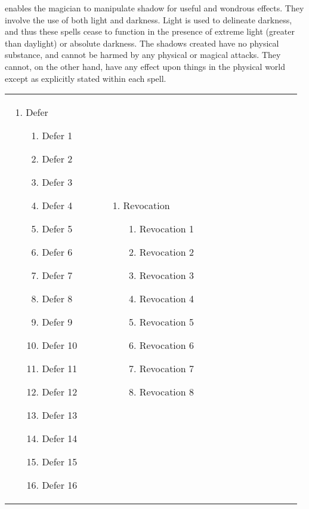  enables the magician to manipulate shadow for useful and wondrous effects. They involve the use of both light and darkness. Light is used to delineate darkness, and thus these spells cease to function in the presence of extreme
light (greater than daylight) or absolute darkness. The shadows created have no physical substance, and cannot be harmed by any physical or magical attacks. They cannot, on the other hand, have any effect upon things in the physical world except as explicitly stated within each spell.

\renewcommand{\labelenumii}{\arabic{enumii}.}
\begin{tabular}{@{} p{0.33\linewidth} p{0.33\linewidth} p{0.33\linewidth}}
\begin{enumerate}
	\item Defer
	\begin{enumerate}
		\item Defer 1
		\item Defer 2
		\item Defer 3
		\item Defer 4
		\item Defer 5
		\item Defer 6
		\item Defer 7
		\item Defer 8
		\item Defer 9
		\item Defer 10
		\item Defer 11
		\item Defer 12
		\item Defer 13
		\item Defer 14
		\item Defer 15
		\item Defer 16
	\end{enumerate}
\end{enumerate} &
\begin{enumerate}
	\item Revocation
	\begin{enumerate}
		\item Revocation 1
		\item Revocation 2
		\item Revocation 3
		\item Revocation 4
		\item Revocation 5
		\item Revocation 6
		\item Revocation 7
		\item Revocation 8

\end{enumerate}
\end{enumerate}
\end{tabular}
